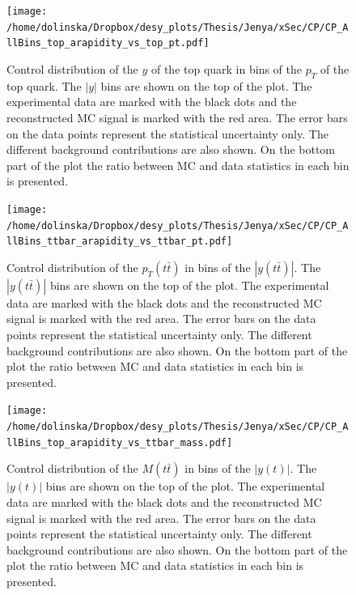 

\begin{figure}[p]
  \centering
  \texttt{[image: /home/dolinska/Dropbox/desy\_plots/Thesis/Jenya/xSec/CP/CP\_AllBins\_top\_arapidity\_vs\_top\_pt.pdf]}
  \caption{Control distribution of the $y$ of the top quark in bins of the $p_{T}$ of the top quark. The $|y|$ bins are shown on the top 
  of the plot. The experimental data are marked with the black dots and the reconstructed MC signal is marked with the red area. The error
  bars on the data points represent the statistical uncertainty only. The 
  different background contributions are also shown. On the bottom part of the plot the ratio between MC and data statistics in each bin
  is presented.}
  \label{fig:CP_2D_y_pt}
\end{figure}

\begin{figure}[p]
  \centering
  \texttt{[image: /home/dolinska/Dropbox/desy\_plots/Thesis/Jenya/xSec/CP/CP\_AllBins\_ttbar\_arapidity\_vs\_ttbar\_pt.pdf]}
  \caption{Control distribution of the $p_{T}(t\bar{t})$ in bins of the $|y(t\bar{t})|$. The $|y(t\bar{t})|$ bins are shown on the top 
  of the plot. The experimental data are marked with the black dots and the reconstructed MC signal is marked with the red area. The error
  bars on the data points represent the statistical uncertainty only. The 
  different background contributions are also shown. On the bottom part of the plot the ratio between MC and data statistics in each bin
  is presented.}
  \label{fig:CP_2D_pttt_ytt}
\end{figure}

\begin{figure}[p]
  \centering
  \texttt{[image: /home/dolinska/Dropbox/desy\_plots/Thesis/Jenya/xSec/CP/CP\_AllBins\_top\_arapidity\_vs\_ttbar\_mass.pdf]}
  \caption{Control distribution of the $M(t\bar{t})$ in bins of the $|y(t)|$. The $|y(t)|$ bins are shown on the top 
  of the plot. The experimental data are marked with the black dots and the reconstructed MC signal is marked with the red area. The error
  bars on the data points represent the statistical uncertainty only. The 
  different background contributions are also shown. On the bottom part of the plot the ratio between MC and data statistics in each bin
  is presented.}
  \label{fig:CP_2D_Mtt_y}
\end{figure}

